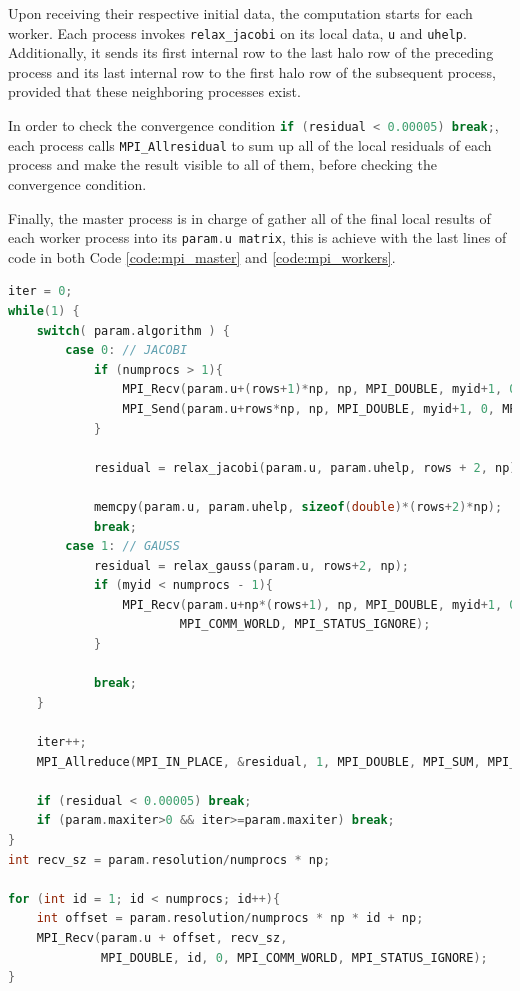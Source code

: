 \documentclass[titlepage]{article}
\newcommand{\incode}[1]{\lstinline[style=inlineC,language=C]{#1}}
\begin{document}
Upon receiving their respective initial data, the computation starts for each worker. Each process invokes \incode{relax_jacobi} on its local data, \incode{u} and \incode{uhelp}. Additionally, it sends its first internal row to the last halo row of the preceding process and its last internal row to the first halo row of the subsequent process, provided that these neighboring processes exist.

In order to check the convergence condition \incode{if (residual < 0.00005) break;}, each process calls \incode{MPI_Allresidual} to sum up all of the local residuals of each process and make the result visible to all of them, before checking the convergence condition.

Finally, the master process is in charge of gather all of the final local results of each worker process into its \incode{param.u matrix}, this is achieve with the last lines of code in both Code \ref{code:mpi_master} and \ref{code:mpi_workers}.

\begin{lstlisting}[label=code:mpi_master,style=c, language=C, caption=MPI Jacobi/Gauss-Seidel convergence for the master process, captionpos=b]
iter = 0;
while(1) {
    switch( param.algorithm ) {
        case 0: // JACOBI
            if (numprocs > 1){
                MPI_Recv(param.u+(rows+1)*np, np, MPI_DOUBLE, myid+1, 0, MPI_COMM_WORLD, MPI_STATUS_IGNORE);
                MPI_Send(param.u+rows*np, np, MPI_DOUBLE, myid+1, 0, MPI_COMM_WORLD);
            }

            residual = relax_jacobi(param.u, param.uhelp, rows + 2, np);

            memcpy(param.u, param.uhelp, sizeof(double)*(rows+2)*np);
            break;
        case 1: // GAUSS
            residual = relax_gauss(param.u, rows+2, np);
            if (myid < numprocs - 1){
                MPI_Recv(param.u+np*(rows+1), np, MPI_DOUBLE, myid+1, 0, 
                        MPI_COMM_WORLD, MPI_STATUS_IGNORE);
            }

            break;
    }

    iter++;
    MPI_Allreduce(MPI_IN_PLACE, &residual, 1, MPI_DOUBLE, MPI_SUM, MPI_COMM_WORLD);

    if (residual < 0.00005) break;
    if (param.maxiter>0 && iter>=param.maxiter) break;
}
int recv_sz = param.resolution/numprocs * np;

for (int id = 1; id < numprocs; id++){
    int offset = param.resolution/numprocs * np * id + np;
    MPI_Recv(param.u + offset, recv_sz, 
             MPI_DOUBLE, id, 0, MPI_COMM_WORLD, MPI_STATUS_IGNORE);
}
\end{lstlisting}
\end{document}
